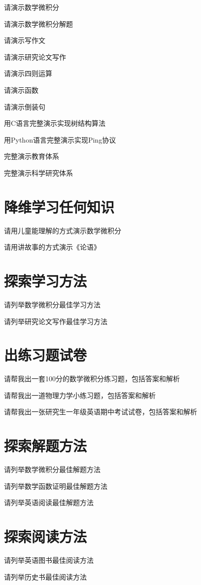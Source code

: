 \documentclass[12pt]{book}
\begin{document}
请演示数学微积分

请演示数学微积分解题

请演示写作文

请演示研究论文写作

请演示四则运算

请演示函数

请演示倒装句

用C语言完整演示实现树结构算法

用Python语言完整演示实现Ping协议

完整演示教育体系

完整演示科学研究体系

\section{降维学习任何知识}

请用儿童能理解的方式演示数学微积分

请用讲故事的方式演示《论语》

\section{探索学习方法}

请列举数学微积分最佳学习方法

请列举研究论文写作最佳学习方法


\section{出练习题试卷}
请帮我出一套100分的数学微积分练习题，包括答案和解析


请帮我出一道物理力学小练习题，包括答案和解析

请帮我出一张研究生一年级英语期中考试试卷，包括答案和解析

\section{探索解题方法}

请列举数学微积分最佳解题方法


请列举数学函数证明最佳解题方法


请列举英语阅读最佳解题方法

\section{探索阅读方法}

请列举英语图书最佳阅读方法

请列举历史书最佳阅读方法
\end{document}

